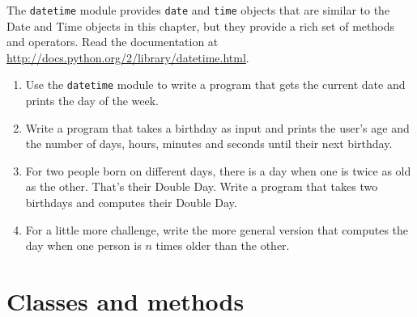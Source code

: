 \documentclass[10pt]{book}
\begin{document}




\begin{exercise}

The {\tt datetime} module provides {\tt date} and {\tt time} objects
that are similar to the Date and Time objects in this chapter, but
they provide a rich set of methods and operators.  Read the
documentation at \url{http://docs.python.org/2/library/datetime.html}.

\begin{enumerate}

\item Use the {\tt datetime} module to write a program that gets the
  current date and prints the day of the week.

\item Write a program that takes a birthday as input and prints the
  user's age and the number of days, hours, minutes and seconds until
  their next birthday.

\item For two people born on different days, there is a day when one
  is twice as old as the other. That's their Double Day.  Write a
  program that takes two birthdays and computes their Double Day.

\item For a little more challenge, write the more general version that
  computes the day when one person is $n$ times older than the other.

\end{enumerate}

\end{exercise}


\chapter{Classes and methods}
\end{document}
